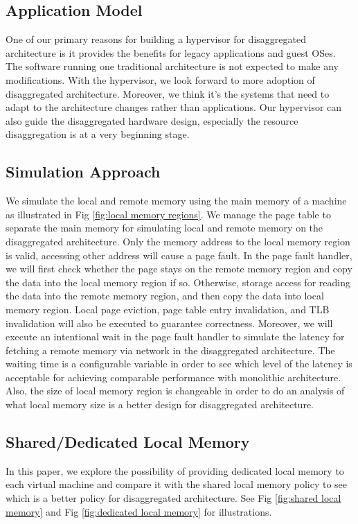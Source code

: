 \documentclass[twocolumn]{article}
\begin{document}
\subsection{Application Model}
One of our primary reasons for building a hypervisor for disaggregated architecture is it provides the benefits for legacy applications and guest OSes. The software running one traditional architecture is not expected to make any modifications. With the hypervisor, we look forward to more adoption of disaggregated architecture. Moreover, we think it's the systems that need to adapt to the architecture changes rather than applications. Our hypervisor can also guide the disaggregated hardware design, especially the resource disaggregation is at a very beginning stage.

\subsection{Simulation Approach}
We simulate the local and remote memory using the main memory of a machine as illustrated in Fig \ref{fig:local memory regions}. We manage the page table to separate the main memory for simulating local and remote memory on the disaggregated architecture. Only the memory address to the local memory region is valid, accessing other address will cause a page fault. In the page fault handler, we will first check whether the page stays on the remote memory region and copy the data into the local memory region if so. Otherwise, storage access for reading the data into the remote memory region, and then copy the data into local memory region. Local page eviction, page table entry invalidation, and TLB invalidation will also be executed to guarantee correctness. Moreover, we will execute an intentional wait in the page fault handler to simulate the latency for fetching a remote memory via network in the disaggregated architecture. The waiting time is a configurable variable in order to see which level of the latency is acceptable for achieving comparable performance with monolithic architecture. Also, the size of local memory region is changeable in order to do an analysis of what local memory size is a better design for disaggregated architecture.

\subsection{Shared/Dedicated Local Memory}
In this paper, we explore the possibility of providing dedicated local memory to each virtual machine and compare it with the shared local memory policy to see which is a better policy for disaggregated architecture. See Fig \ref{fig:shared local memory} and Fig \ref{fig:dedicated local memory} for illustrations.
\end{document}

